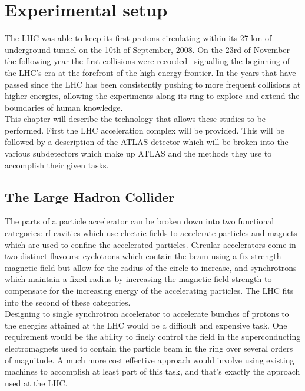 \chapter{Experimental setup}
\label{Experiment}
The \gls{LHC} was able to keep its first protons circulating within its 27 km of underground tunnel on the 10th of September, 2008.  
On the 23rd of November the following year the first collisions were recorded~\cite{FirstCollisions} signalling the beginning of the LHC's era at the forefront of the high energy frontier.  
In the years that have passed since the LHC has been consistently pushing to more frequent collisions at higher energies, allowing the experiments along its ring to explore and extend the boundaries of human knowledge.  \\

This chapter will describe the technology that allows these studies to be performed.  
First the LHC acceleration complex will be provided.  
This will be followed by a description of the ATLAS detector which will be broken into the various subdetectors which make up ATLAS and the methods they use to accomplish their given tasks.   

\section{The Large Hadron Collider}
\label{Sec:LHC}

The parts of a particle accelerator can be broken down into two functional categories: rf cavities which use electric fields to accelerate particles and magnets which are used to confine the accelerated particles.  
Circular accelerators come in two distinct flavours: cyclotrons which contain the beam using a fix strength magnetic field but allow for the radius of the circle to increase, and synchrotrons which maintain a fixed radius by increasing the magnetic field strength to compensate for the increasing energy of the accelerating particles.  
The LHC fits into the second of these categories.  \\

Designing to single synchrotron accelerator to accelerate bunches of protons to the energies attained at the LHC would be a difficult and expensive task.
One requirement would be the ability to finely control the field in the superconducting electromagnets used to contain the particle beam in the ring over several orders of magnitude.  
A much more cost effective approach would involve using existing machines to accomplish at least part of this task, and that's exactly the approach used at the LHC.  \\


